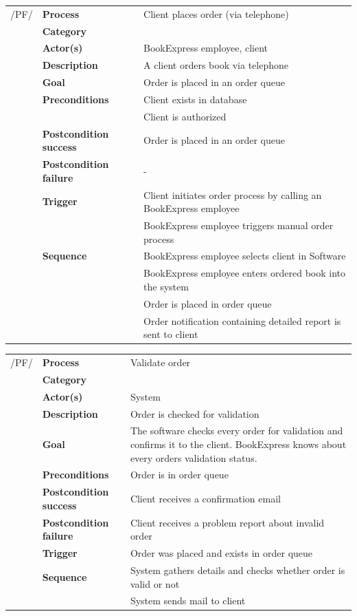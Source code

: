 \documentclass[11pt,a4paper,oneside,svgnames]{report}
\begin{document}
\begin{tabular}{p{1.5cm}p{3cm}p{8cm}}
	 /PF/	& \textbf{Process} & Client places order (via telephone)\\ 
		& \textbf{Category} & \\
		& \textbf{Actor(s)} & BookExpress employee, client\\ 
		& \textbf{Description}	 & A client orders book via telephone\\ 
		& \textbf{Goal} & Order is placed in an order queue\\
		& \textbf{Preconditions} & Client exists in database\\
		& & Client is authorized\\
		& \textbf{Postcondition success} & Order is placed in an order queue\\
		& \textbf{Postcondition failure} & -\\
		& \textbf{Trigger} & Client initiates order process by calling an BookExpress employee\\
		& & BookExpress employee triggers manual order process\\
		& \textbf{Sequence} & BookExpress employee selects client in Software\\
		& & BookExpress employee enters ordered book into the system\\
		& & Order is placed in order queue\\
		& & Order notification containing detailed report is sent to client\\
\end{tabular}

\begin{tabular}{p{1.5cm}p{3cm}p{8cm}}
	 /PF/	& \textbf{Process} & Validate order\\ 
		& \textbf{Category} & \\
		& \textbf{Actor(s)} & System\\ 
		& \textbf{Description}	 & Order is checked for validation\\ 
		& \textbf{Goal} & The software checks every order for validation and confirms it to the client. BookExpress knows about every orders validation status.\\
		& \textbf{Preconditions} & Order is in order queue\\
		& \textbf{Postcondition success} & Client receives a confirmation email\\
		& \textbf{Postcondition failure} & Client receives a problem report about invalid order\\
		& \textbf{Trigger} & Order was placed and exists in order queue\\
		& \textbf{Sequence} & System  gathers details and checks whether order is valid or not\\
		& & System sends mail to client\\
\end{tabular}
\end{document}
